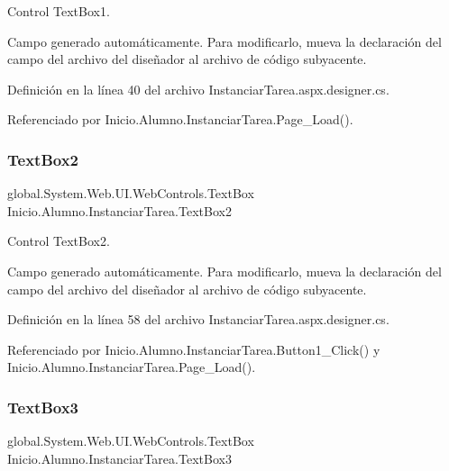 Control Text\+Box1. 

Campo generado automáticamente. Para modificarlo, mueva la declaración del campo del archivo del diseñador al archivo de código subyacente. 

Definición en la línea 40 del archivo Instanciar\+Tarea.\+aspx.\+designer.\+cs.



Referenciado por Inicio.\+Alumno.\+Instanciar\+Tarea.\+Page\+\_\+\+Load().

\mbox{\label{classInicio_1_1Alumno_1_1InstanciarTarea_a7e0031538f14b48418c1eacc914e722f}} 
\subsubsection{\texorpdfstring{TextBox2}{TextBox2}}
{\footnotesize\ttfamily global.\+System.\+Web.\+U\+I.\+Web\+Controls.\+Text\+Box Inicio.\+Alumno.\+Instanciar\+Tarea.\+Text\+Box2\hspace{0.3cm}{\ttfamily [protected]}}



Control Text\+Box2. 

Campo generado automáticamente. Para modificarlo, mueva la declaración del campo del archivo del diseñador al archivo de código subyacente. 

Definición en la línea 58 del archivo Instanciar\+Tarea.\+aspx.\+designer.\+cs.



Referenciado por Inicio.\+Alumno.\+Instanciar\+Tarea.\+Button1\+\_\+\+Click() y Inicio.\+Alumno.\+Instanciar\+Tarea.\+Page\+\_\+\+Load().

\mbox{\label{classInicio_1_1Alumno_1_1InstanciarTarea_a006a822d84d6740bbccbd2f56324c4fe}} 
\subsubsection{\texorpdfstring{TextBox3}{TextBox3}}
{\footnotesize\ttfamily global.\+System.\+Web.\+U\+I.\+Web\+Controls.\+Text\+Box Inicio.\+Alumno.\+Instanciar\+Tarea.\+Text\+Box3\hspace{0.3cm}{\ttfamily [protected]}}



